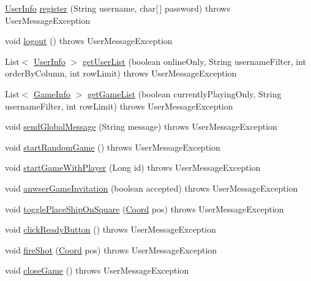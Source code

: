 \begin{DoxyCompactItemize}
\item 
\hyperlink{classpt_1_1up_1_1fe_1_1lpro1613_1_1sharedlib_1_1tuples_1_1_user_info}{User\+Info} \hyperlink{classclient_1_1conn_1_1_server_a945189dab00f6350cb5a444a910c4dd5}{register} (String username, char\mbox{[}$\,$\mbox{]} password)  throws User\+Message\+Exception 
\item 
void \hyperlink{classclient_1_1conn_1_1_server_af45689754d02a83d53602d01a9bf2427}{logout} ()  throws User\+Message\+Exception 
\item 
List$<$ \hyperlink{classpt_1_1up_1_1fe_1_1lpro1613_1_1sharedlib_1_1tuples_1_1_user_info}{User\+Info} $>$ \hyperlink{classclient_1_1conn_1_1_server_a8512a2e59d7e29fb25b913220050060d}{get\+User\+List} (boolean online\+Only, String username\+Filter, int order\+By\+Column, int row\+Limit)  throws User\+Message\+Exception 
\item 
List$<$ \hyperlink{classpt_1_1up_1_1fe_1_1lpro1613_1_1sharedlib_1_1tuples_1_1_game_info}{Game\+Info} $>$ \hyperlink{classclient_1_1conn_1_1_server_ab1f159361ca4682e87f2cea6224f094a}{get\+Game\+List} (boolean currently\+Playing\+Only, String username\+Filter, int row\+Limit)  throws User\+Message\+Exception 
\item 
void \hyperlink{classclient_1_1conn_1_1_server_acbe845e1fc6ba7857fcf6d01377f5432}{send\+Global\+Message} (String message)  throws User\+Message\+Exception 
\item 
void \hyperlink{classclient_1_1conn_1_1_server_afbeea330d5f40a6edd87387fa71bcc2d}{start\+Random\+Game} ()  throws User\+Message\+Exception 
\item 
void \hyperlink{classclient_1_1conn_1_1_server_a6336de53822bd12d42e8445a598f2838}{start\+Game\+With\+Player} (Long id)  throws User\+Message\+Exception 
\item 
void \hyperlink{classclient_1_1conn_1_1_server_a28692c894a8055b95dd493fbaec8b567}{anwser\+Game\+Invitation} (boolean accepted)  throws User\+Message\+Exception 
\item 
void \hyperlink{classclient_1_1conn_1_1_server_a9894c54137e6f203dd38a47fe3514c27}{toggle\+Place\+Ship\+On\+Square} (\hyperlink{classpt_1_1up_1_1fe_1_1lpro1613_1_1sharedlib_1_1utils_1_1_coord}{Coord} pos)  throws User\+Message\+Exception 
\item 
void \hyperlink{classclient_1_1conn_1_1_server_a7e54680c0fb053bee969c41f093aa5c4}{click\+Ready\+Button} ()  throws User\+Message\+Exception 
\item 
void \hyperlink{classclient_1_1conn_1_1_server_ab1d2fa19e855a803efff54edd2113d83}{fire\+Shot} (\hyperlink{classpt_1_1up_1_1fe_1_1lpro1613_1_1sharedlib_1_1utils_1_1_coord}{Coord} pos)  throws User\+Message\+Exception 
\item 
void \hyperlink{classclient_1_1conn_1_1_server_a5d1f1961306d3e06c895abc90dfddf9f}{close\+Game} ()  throws User\+Message\+Exception 
\end{DoxyCompactItemize}


